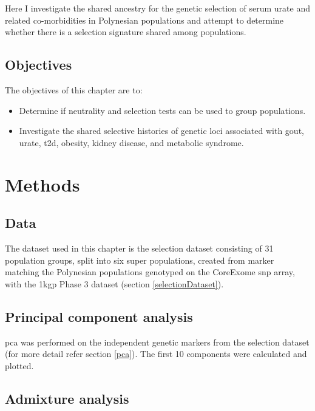 \documentclass[twoside,openright]{report}
\providecommand{\tightlist}{%
  \setlength{\itemsep}{0pt}\setlength{\parskip}{0pt}}
\begin{document}
Here I investigate the shared ancestry for the genetic selection of
serum urate and related co-morbidities in Polynesian populations and
attempt to determine whether there is a selection signature shared among
populations.

\subsection{Objectives}\label{objectives-1}

The objectives of this chapter are to:

\begin{itemize}
\tightlist
\item
  Determine if neutrality and selection tests can be used to group
  populations.
\item
  Investigate the shared selective histories of genetic loci associated
  with gout, urate, \gls{t2d}, obesity, kidney disease, and metabolic
  syndrome.
\end{itemize}

\section{Methods}\label{methods-1}

\subsection{Data}\label{data}

The dataset used in this chapter is the selection dataset consisting of
31 population groups, split into six super populations, created from
marker matching the Polynesian populations genotyped on the CoreExome
\gls{snp} array, with the \gls{1kgp} Phase 3 dataset (section
\ref{selectionDataset}).

\subsection{Principal component
analysis}\label{principal-component-analysis}

\Glsdesc{pca} was performed on the independent genetic markers from the
selection dataset (for more detail refer section \ref{pca}). The first
10 components were calculated and plotted.

\subsection{Admixture analysis}\label{admixture-analysis}
\end{document}
